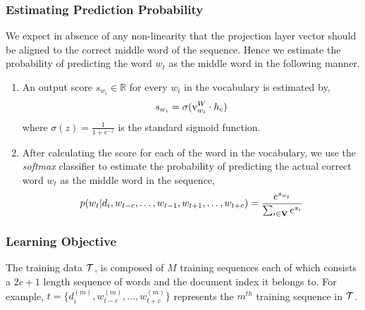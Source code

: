 \subsubsection{Estimating Prediction Probability}
We expect in absence of any non-linearity that the projection layer vector should be aligned to the correct middle word of the sequence. Hence we estimate the probability of predicting the word $w_{t}$ as the middle word in the following manner. 
\begin{enumerate}
\item An output score $s_{w_{i}} \in \mathbb{R}$ for every $w_{i}$ in the vocabulary is estimated by,
\begin{equation}
\label{eq:nn_score}
s_{w_{i}} = \sigma(\mathrm{v}^{W}_{w_{i}}\cdot h_{c})
\end{equation}
where $\sigma(z) = \frac{1}{1+e^{-z}}$ is the standard sigmoid function. 
\item After calculating the score for each of the word in the vocabulary, we use the \emph{softmax} classifier to estimate the probability of predicting the actual correct word $w_{t}$ as the middle word in the sequence,
\begin{equation}
\label{eq:soft_prob}
p(w_{t} | d_{i}, w_{t-c}, \ldots, w_{t-1}, w_{t+1}, \ldots, w_{t+c}) = \frac{e^{s_{w_{t}}}}{\sum_{i \in \mathbf{V}} e^{s_{i}}}
\end{equation}
\end{enumerate}

\subsubsection{Learning Objective}
The training data $\mathcal{T}$, is composed of $M$ training sequences each of which consists a $2c+1$ length sequence of words and the document index it belongs to. For example, $t = \{d^{(m)}_{i}, w^{(m)}_{t-c}, \ldots, w^{(m)}_{t+c}\}$ represents the $m^{th}$ training sequence in $\mathcal{T}$.  

